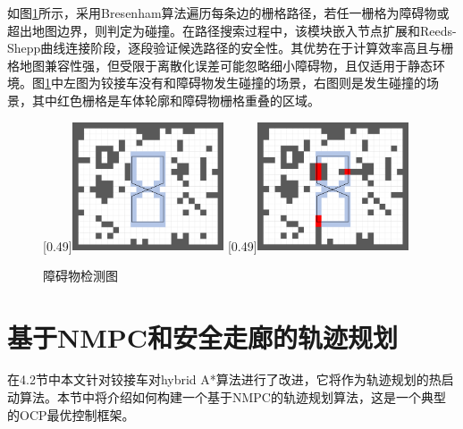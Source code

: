 \documentclass[master,academic]{ysuthesis} %
\begin{document}
		如图\ref{fig:障碍物检测图}所示，采用Bresenham算法遍历每条边的栅格路径，若任一栅格为障碍物或超出地图边界，则判定为碰撞。在路径搜索过程中，该模块嵌入节点扩展和Reeds-Shepp曲线连接阶段，逐段验证候选路径的安全性。其优势在于计算效率高且与栅格地图兼容性强，但受限于离散化误差可能忽略细小障碍物，且仅适用于静态环境。图\ref{fig:障碍物检测图}中左图为铰接车没有和障碍物发生碰撞的场景，右图则是发生碰撞的场景，其中红色栅格是车体轮廓和障碍物栅格重叠的区域。
		\begin{figure}[!ht]
			\centering
			[0.49\textwidth]{\includegraphics[width=0.4\textwidth]{bresham_free.png}}
			[0.49\textwidth]{\includegraphics[width=0.4\textwidth]{bresham_colli.png}}
			\caption{障碍物检测图}
			\label{fig:障碍物检测图}
		\end{figure}
	\section{基于NMPC和安全走廊的轨迹规划}
	在4.2节中本文针对铰接车对hybrid A*算法进行了改进，它将作为轨迹规划的热启动算法。本节中将介绍如何构建一个基于NMPC的轨迹规划算法，这是一个典型的OCP最优控制框架。
\end{document}
